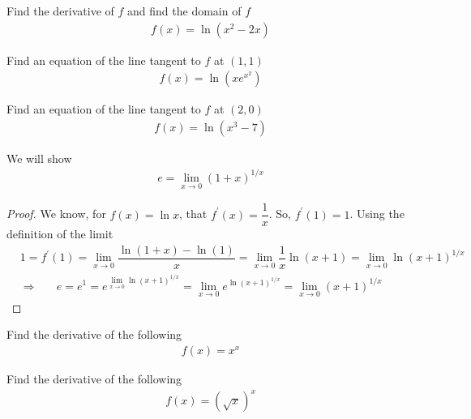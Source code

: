 \begin{exercise}
Find the derivative of $f$ and find the domain of $f$
\begin{align*}
    f(x) = \ln (x^{2} - 2x)
\end{align*}
\end{exercise}

\begin{exercise}
Find an equation of the line tangent to $f$ at $(1, 1)$
\begin{align*}
    f(x) = \ln (xe^{x^{2}})
\end{align*}
\end{exercise}

\begin{exercise}
Find an equation of the line tangent to $f$ at $(2, 0)$
\begin{align*}
    f(x) = \ln(x^{3} - 7)
\end{align*}
\end{exercise}

\begin{theorem}
We will show
\begin{align*}
    e = \lim_{x \longrightarrow 0} (1 + x)^{1/x}
\end{align*}
\begin{proof}
We know, for $f(x) = \ln x$, that $f^{'}(x) = \dfrac{1}{x}$. So, $f^{'}(1) = 1$. Using the definition of the limit
\begin{align*}
    &1 = f^{'}(1) = \lim_{x \longrightarrow 0} \dfrac{\ln (1+x) - \ln (1)}{x} = \lim_{x \longrightarrow 0} \dfrac{1}{x} \ln (x + 1) = \lim_{x \longrightarrow 0} \ln (x+1)^{1/x}\\[2ex]
    &\Longrightarrow \hspace{20pt} e = e^{1} = e^{\lim_{x \longrightarrow 0} \ln (x+1)^{1/x}} = \lim_{x \longrightarrow 0} e^{\ln (x+1)^{1/x}} = \lim_{x \longrightarrow 0} (x + 1)^{1/x}
\end{align*}
\end{proof}
\end{theorem}

\begin{exercise}
Find the derivative of the following
\begin{align*}
    f(x) = x^{x}
\end{align*}
\end{exercise}

\begin{exercise}
Find the derivative of the following
\begin{align*}
    f(x) = (\sqrt{x})^{x}
\end{align*}
\end{exercise}

